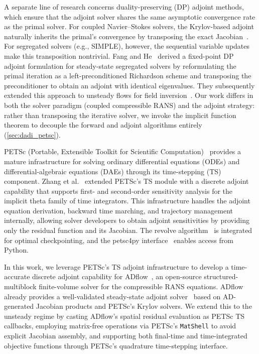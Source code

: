 \documentclass[journal]{new-aiaa}
\begin{document}
A separate line of research concerns duality-preserving (DP) adjoint methods, which ensure that the adjoint solver shares the same asymptotic convergence rate as the primal solver.
For coupled Navier--Stokes solvers, the Krylov-based adjoint naturally inherits the primal's convergence by transposing the exact Jacobian~\cite{Kenway2019}.
For segregated solvers (e.g., SIMPLE), however, the sequential variable updates make this transposition nontrivial.
Fang and He~\cite{Fang2024} derived a fixed-point DP adjoint formulation for steady-state segregated solvers by reformulating the primal iteration as a left-preconditioned Richardson scheme and transposing the preconditioner to obtain an adjoint with identical eigenvalues.
They subsequently extended this approach to unsteady flows for field inversion~\cite{Fang2024b}.
Our work differs in both the solver paradigm (coupled compressible RANS) and the adjoint strategy: rather than transposing the iterative solver, we invoke the implicit function theorem to decouple the forward and adjoint algorithms entirely (\cref{sec:dadi_petsc}).

PETSc (Portable, Extensible Toolkit for Scientific Computation)~\cite{petsc-web-page, petsc-user-ref} provides a mature infrastructure for solving ordinary differential equations (ODEs) and differential-algebraic equations (DAEs) through its time-stepping (TS) component.
Zhang et al.~\cite{Zhang2022} extended PETSc's TS module with a discrete adjoint capability that supports first- and second-order sensitivity analysis for the implicit theta family of time integrators.
This infrastructure handles the adjoint equation derivation, backward time marching, and trajectory management internally, allowing solver developers to obtain adjoint sensitivities by providing only the residual function and its Jacobian.
The revolve algorithm~\cite{Griewank2000} is integrated for optimal checkpointing, and the petsc4py interface~\cite{Dalcin2011} enables access from Python.

In this work, we leverage PETSc's TS adjoint infrastructure to develop a time-accurate discrete adjoint capability for ADflow~\cite{ADflow2020}, an open-source structured-multiblock finite-volume solver for the compressible RANS equations.
ADflow already provides a well-validated steady-state adjoint solver~\cite{Kenway2019, Mader2020} based on AD-generated Jacobian products and PETSc's Krylov solvers.
We extend this to the unsteady regime by casting ADflow's spatial residual evaluation as PETSc TS callbacks, employing matrix-free operations via PETSc's \texttt{MatShell} to avoid explicit Jacobian assembly, and supporting both final-time and time-integrated objective functions through PETSc's quadrature time-stepping interface.
\end{document}
